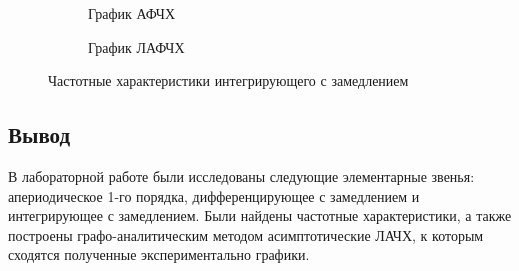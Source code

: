 \documentclass[a4paper, 11pt]{article}
\begin{document}
\begin{figure}[h!]
    \begin{subfigure}{0.5\textwidth}
        \centering
        \caption{График АФЧХ}
    \end{subfigure}
    \begin{subfigure}{0.5\textwidth}
        \centering
        \caption{График ЛАФЧХ}
    \end{subfigure}
    \caption{Частотные характеристики интегрирующего с замедлением}
\end{figure}

\newpage
\begin{center}
	\section*{Вывод}
\end{center}
\par 
В лабораторной работе были исследованы следующие элементарные звенья: апериодическое 1-го порядка, дифференцирующее с замедлением и интегрирующее с замедлением. Были найдены частотные характеристики, а также построены графо-аналитическим методом асимптотические ЛАЧХ, к которым сходятся полученные экспериментально графики.
\end{document}
